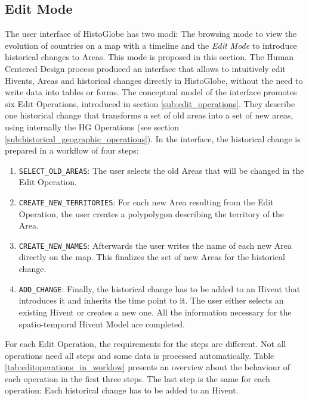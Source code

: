 
\subsection{Edit Mode} %
\label{sub:edit_mode}

The user interface of HistoGlobe has two modi: The browsing mode to view the evolution of countries on a map with a timeline and the \emph{Edit Mode} to introduce historical changes to Areas. This mode is proposed in this section. The Human Centered Design process produced an interface that allows to intuitively edit Hivents, Areas and historical changes directly in HistoGlobe, without the need to write data into tables or forms. The conceptual model of the interface promotes six Edit Operations, introduced in section \ref{sub:edit_operations}. They describe one historical change that transforms a set of old areas into a set of new areas, using internally the HG Operations (see section \ref{sub:historical_geographic_operations}). In the interface, the historical change is prepared in a workflow of four steps:

\begin{enumerate}
  \item \texttt{SELECT\_OLD\_AREAS}: The user selects the old Areas that will be changed in the Edit Operation.
  \item \texttt{CREATE\_NEW\_TERRITORIES}: For each new Area resulting from the Edit Operation, the user creates a polypolygon describing the territory of the Area.
  \item \texttt{CREATE\_NEW\_NAMES}: Afterwards the user writes the name of each new Area directly on the map. This finalizes the set of new Areas for the historical change.
  \item \texttt{ADD\_CHANGE}: Finally, the historical change has to be added to an Hivent that introduces it and inherits the time point to it. The user either selects an existing Hivent or creates a new one. All the information necessary for the spatio-temporal Hivent Model are completed.
\end{enumerate}

For each Edit Operation, the requirements for the steps are different. Not all operations need all steps and some data is processed automatically. Table \ref{tab:editoperations_in_worklow} presents an overview about the behaviour of each operation in the first three steps. The last step is the same for each operation: Each historical change has to be added to an Hivent.

